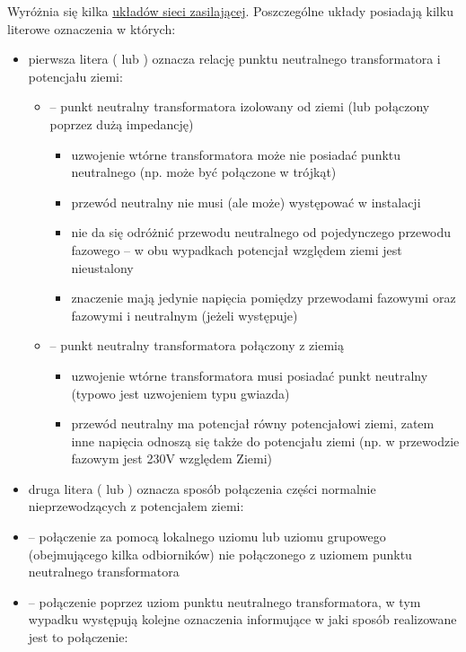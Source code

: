Wyróżnia się kilka \href{https://en.wikipedia.org/wiki/Earthing_system}{układów sieci zasilającej}. Poszczególne układy posiadają kilku literowe oznaczenia w których:
\begin{itemize}
	\item pierwsza litera ( lub ) oznacza relację punktu neutralnego transformatora i potencjału ziemi:
	\begin{itemize}
		\item {} – punkt neutralny transformatora izolowany od ziemi (lub połączony poprzez dużą impedancję)
		\begin{itemize}
			\item uzwojenie wtórne transformatora może nie posiadać punktu neutralnego (np. może być połączone w trójkąt)
			\item przewód neutralny nie musi (ale może) występować w instalacji
			\item nie da się odróżnić przewodu neutralnego od pojedynczego przewodu fazowego – w obu wypadkach potencjał względem ziemi jest nieustalony
			\item znaczenie mają jedynie napięcia pomiędzy przewodami fazowymi oraz fazowymi i neutralnym (jeżeli występuje)
		\end{itemize}
		\item {} – punkt neutralny transformatora połączony z ziemią
		\begin{itemize}
			\item uzwojenie wtórne transformatora musi posiadać punkt neutralny (typowo jest uzwojeniem typu gwiazda)
			\item przewód neutralny ma potencjał równy potencjałowi ziemi, zatem inne napięcia odnoszą się także do potencjału ziemi (np. w przewodzie fazowym jest 230V względem Ziemi)
		\end{itemize}
	\end{itemize}
	\item druga litera ( lub ) oznacza sposób połączenia części normalnie nieprzewodzących z potencjałem ziemi:
		\item {} – połączenie za pomocą lokalnego uziomu lub uziomu grupowego (obejmującego kilka odbiorników) nie połączonego z uziomem punktu neutralnego transformatora
		\item {} – połączenie poprzez uziom punktu neutralnego transformatora, w tym wypadku występują kolejne oznaczenia informujące w jaki sposób realizowane jest to połączenie:
		\begin{itemize}

\end{itemize}
\end{itemize}
